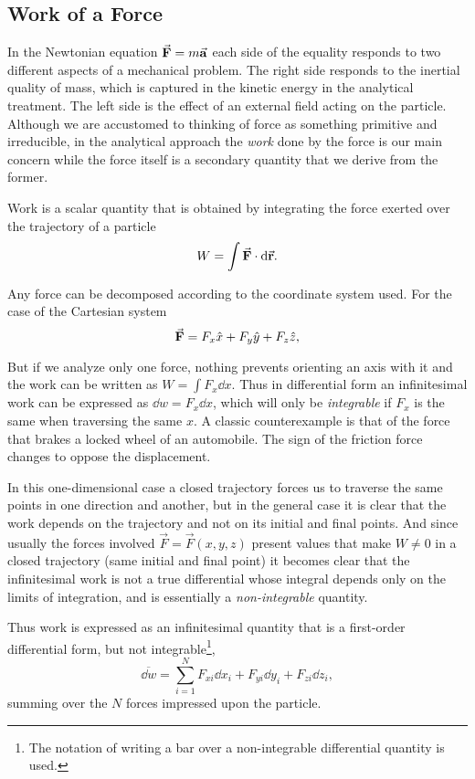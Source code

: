 \documentclass[12pt, english, a4paper]{article}
\begin{document}
\subsection{Work of a Force}
In the Newtonian equation \(\va{F}= m \va{a}\) each side of the equality responds to two different aspects of a mechanical problem.
The right side responds to the inertial quality of mass, which is captured in the kinetic energy in the analytical treatment.
The left side is the effect of an external field acting on the particle.
Although we are accustomed to thinking of force as something primitive and irreducible, in the analytical approach the \emph{work} done by the force is our main concern while the force itself is a secondary quantity that we derive from the former.

Work is a scalar quantity that is obtained by integrating the force exerted over the trajectory of a particle
\begin{equation}
	W= \int \va{F} \cdot \dd\va{r}.
\end{equation}

Any force can be decomposed according to the coordinate system used.
For the case of the Cartesian system
\begin{equation}
	\va{F}= F_x \hat{x}+ F_y \hat{y}+ F_z \hat{z},
\end{equation}

But if we analyze only one force, nothing prevents orienting an axis with it and the work can be written as \(W= \int F_x \dd x\).
Thus in differential form an infinitesimal work can be expressed as \(\dd w= F_x \dd x\), which will only be \emph{integrable} if \(F_x\) is the same when traversing the same \(x\).
A classic counterexample is that of the force that brakes a locked wheel of an automobile.
The sign of the friction force changes to oppose the displacement.

In this one-dimensional case a closed trajectory forces us to traverse the same points in one direction and another, but in the general case it is clear that the work depends on the trajectory and not on its initial and final points.
And since usually the forces involved \(\vec{F}= \vec{F}(x,y,z)\) present values that make \(W \neq 0 \) in a closed trajectory (same initial and final point) it becomes clear that the infinitesimal work is not a true differential whose integral depends only on the limits of integration, and is essentially a \emph{non-integrable} quantity.

Thus work is expressed as an infinitesimal quantity that is a first-order differential form, but not integrable\footnote{The notation of writing a bar over a non-integrable differential quantity is used.}, 
\begin{equation}\label{Lanczos17.2}
	\overline{\dd w}= \displaystyle\sum_{i=1}^{N} F_{xi} \dd x_i+ F_{yi} \dd y_i+ F_{zi} \dd z_i,
	\tag{Lanczos 17.2}
\end{equation}
summing over the \(N\) forces impressed upon the particle.
\end{document}
